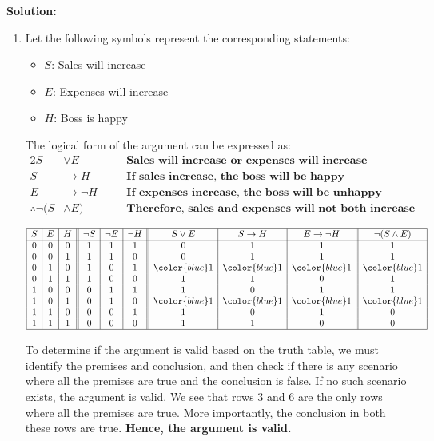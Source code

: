 \textbf{Solution:}
\begin{enumerate}[label=(\alph*)]
    \item Let the following symbols represent the corresponding statements:
    \begin{itemize}
        \item $S$: Sales will increase
        \item $E$: Expenses will increase
        \item $H$: Boss is happy
    \end{itemize}
    The logical form of the argument can be expressed as:
    \begin{alignat*}{2}
        S & \vee E && \quad \textbf{Sales will increase or expenses will increase} \\
        S & \rightarrow H && \quad \textbf{If sales increase, the boss will be happy} \\
        E & \rightarrow \neg H && \quad \textbf{If expenses increase, the boss will be unhappy} \\
        \therefore \neg (S & \wedge E) && \quad \textbf{Therefore, sales and expenses will not both increase}
    \end{alignat*}
    
    \[
    \begin{array}{|c|c|c||c|c|c||c|c|c||c|}
    \hline
    S & E & H & \neg S & \neg E & \neg H & S \vee E & S \rightarrow H & E \rightarrow \neg H & \neg (S \wedge E) \\
    \hline
    0 & 0 & 0 & 1 & 1 & 1 & 0 & 1 & 1 & 1 \\
    0 & 0 & 1 & 1 & 1 & 0 & 0 & 1 & 1 & 1 \\
    0 & 1 & 0 & 1 & 0 & 1 & \color{blue}1 & \color{blue}1 & \color{blue}1 & \color{blue}1 \\
    0 & 1 & 1 & 1 & 0 & 0 & 1 & 1 & 0 & 1 \\
    1 & 0 & 0 & 0 & 1 & 1 & 1 & 0 & 1 & 1 \\
    1 & 0 & 1 & 0 & 1 & 0 & \color{blue}1 & \color{blue}1 & \color{blue}1 & \color{blue}1 \\
    1 & 1 & 0 & 0 & 0 & 1 & 1 & 0 & 1 & 0 \\
    1 & 1 & 1 & 0 & 0 & 0 & 1 & 1 & 0 & 0 \\
    \hline
    \end{array}
    \]

    To determine if the argument is valid based on the truth table, we must identify the premises and conclusion, and then check if there is any scenario where all the premises are true and the conclusion is false. If no such scenario exists, the argument is valid. We see that rows 3 and 6 are the only rows where all the premises are true. More importantly, the conclusion in both these rows are true. \textbf{Hence, the argument is valid.}
    \pagebreak


\end{enumerate}

